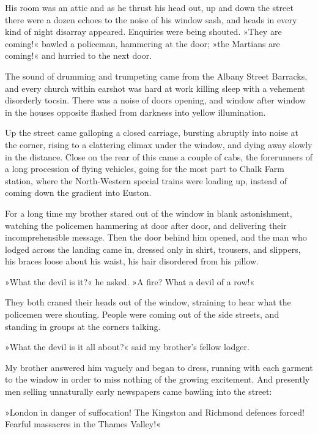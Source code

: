 His room was an attic and as he thrust his head out, up and down the street there were a dozen echoes to the noise of his window sash, and heads in every kind of night disarray appeared. Enquiries were being shouted. »They are coming!« bawled a policeman, hammering at the door; »the Martians are coming!« and hurried to the next door.

The sound of drumming and trumpeting came from the Albany Street Barracks, and every church within earshot was hard at work killing sleep with a vehement disorderly tocsin. There was a noise of doors opening, and window after window in the houses opposite flashed from darkness into yellow illumination.

Up the street came galloping a closed carriage, bursting abruptly into noise at the corner, rising to a clattering climax under the window, and dying away slowly in the distance. Close on the rear of this came a couple of cabs, the forerunners of a long procession of flying vehicles, going for the most part to Chalk Farm station, where the North-Western special trains were loading up, instead of coming down the gradient into Euston.



For a long time my brother stared out of the window in blank astonishment, watching the policemen hammering at door after door, and delivering their incomprehensible message. Then the door behind him opened, and the man who lodged across the landing came in, dressed only in shirt, trousers, and slippers, his braces loose about his waist, his hair disordered from his pillow.

»What the devil is it?« he asked. »A fire? What a devil of a row!«

They both craned their heads out of the window, straining to hear what the policemen were shouting. People were coming out of the side streets, and standing in groups at the corners talking.

»What the devil is it all about?« said my brother's fellow lodger.

My brother answered him vaguely and began to dress, running with each garment to the window in order to miss nothing of the growing excitement. And presently men selling unnaturally early newspapers came bawling into the street:

»London in danger of suffocation! The Kingston and Richmond defences forced! Fearful massacres in the Thames Valley!«


